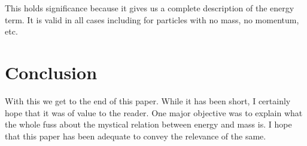 \documentclass[16pt]{scrartcl}
\numberwithin{equation}{section}
\theoremstyle{plain}
\theoremstyle{definition}
\begin{document}
This holds significance because it gives us a complete description of the energy term. It is valid in all cases including for particles with no mass, no momentum, etc.

\section{Conclusion}

With this we get to the end of this paper. While it has been short, I certainly hope that it was of value to the reader. One major objective was to explain what the whole fuss about the mystical relation between energy and mass is. I hope that this paper has been adequate to convey the relevance of the same.
\end{document}
